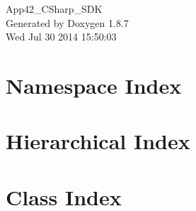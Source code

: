 \documentclass[twoside]{book}
\newcommand{\+}{\discretionary{\mbox{\scriptsize$\hookleftarrow$}}{}{}}
\newcommand{\clearemptydoublepage}{%
  \newpage{\pagestyle{empty}\cleardoublepage}%
}
\begin{document}
\hypersetup{pageanchor=false,
             bookmarks=true,
             bookmarksnumbered=true,
             pdfencoding=unicode
            }
\begin{titlepage}
\vspace*{7cm}
\begin{center}%
{\Large App42\+\_\+\+C\+Sharp\+\_\+\+S\+D\+K }\\
\vspace*{1cm}
{\large Generated by Doxygen 1.8.7}\\
\vspace*{0.5cm}
{\small Wed Jul 30 2014 15:50:03}\\
\end{center}
\end{titlepage}
\clearemptydoublepage
\tableofcontents
\clearemptydoublepage
{}
\hypersetup{pageanchor=true}

\chapter{Namespace Index}

\chapter{Hierarchical Index}

\chapter{Class Index}

\end{document}
